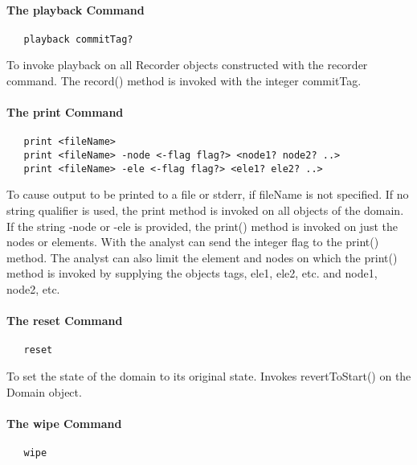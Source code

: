 \documentclass[12pt]{article}
\begin{document}
\paragraph {The playback Command}

{\sf\small
\begin{verbatim}
   playback commitTag?
\end{verbatim}
}

\noindent To invoke playback on all Recorder objects constructed with
the recorder command. The record() method is invoked with the integer
commitTag. 

\paragraph {The print Command}

{\sf\small
\begin{verbatim}
   print <fileName> 
   print <fileName> -node <-flag flag?> <node1? node2? ..>
   print <fileName> -ele <-flag flag?> <ele1? ele2? ..>
\end{verbatim}
}

\noindent To cause output to be printed to a file or stderr, if fileName is not
specified. If no string qualifier is used, the print method is
invoked on all objects of the domain. If the string -node or -ele is provided,
the print() method is invoked on just the nodes or elements. With
the analyst can send the integer flag to the print() method. The
analyst can also limit the element and nodes on which the
print() method is invoked by supplying the objects tags, ele1, ele2,
etc. and node1, node2, etc.

\paragraph {The reset Command}

{\sf\small
\begin{verbatim}
   reset
\end{verbatim}
 }

\noindent To set the state of the domain to its original state. Invokes
revertToStart() on the Domain object.

\paragraph {The wipe Command}

{\sf\small
\begin{verbatim}
   wipe
\end{verbatim}
}
\end{document}
